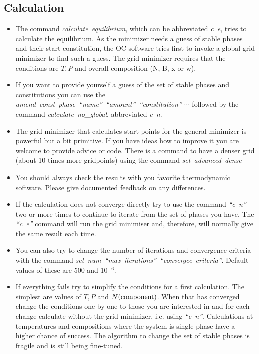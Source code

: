 \documentclass[12pt]{article}
\begin{document}
\subsection{Calculation}

\begin{itemize}
\item The command {\em calculate~equilibrium}, which can be
  abbreviated {\em c~e}, tries to calculate the equilibrium.  As the
  minimizer needs a guess of stable phases and their start
  constitution, the OC software tries first to invoke a global grid
  minimizer to find such a guess.  The grid minimizer requires that
  the conditions are $T, P$ and overall composition (N, B, x or w).

\item If you want to provide yourself a guess of the set of stable
  phases and constitutions you can use the {\em
    amend~const~phase~``name''~``amount''~``constitution'' $\cdots$}
  followed by the command {\em calculate~no\_global}, abbreviated {\em
    c~n}.

\item The grid minimizer that calculates start points for the general
  minimizer is powerful but a bit primitive.  If you have ideas how to
  improve it you are welcome to provide advice or code.  There is
  a command to have a denser grid (about 10 times more gridpoints) using
  the command {\em set~advanced~dense}

\item You should always check the results with you favorite
  thermodynamic software.  Please give documented feedback on any
  differences.

\item If the calculation does not converge directly try to use the
  command {\em ``c~n''} two or more times to continue to iterate from
  the set of phases you have.  The {\em ``c~e''} command will run the
  grid minimiser and, therefore, will normally give the same result
  each time.

\item You can also try to change the number of iterations and
  convergence criteria with the command {\em
    set~num~``max~iterations''~``convergce~criteria''}.  Default
  values of these are 500 and 10$^{-6}$.

\item If everything fails try to simplify the conditions for a first
  calculation.  The simplest are values of $T, P$ and $N(\rm
  component)$. When that has converged change the conditions one by
  one to those you are interested in and for each change calculate
  without the grid minimizer, i.e.  using {\em ``c~n''}.  Calculations
  at temperatures and compositions where the system is single phase
  have a higher chance of success.  The algorithm to change the set of
  stable phases is fragile and is still being fine-tuned.


\end{itemize}
\end{document}

